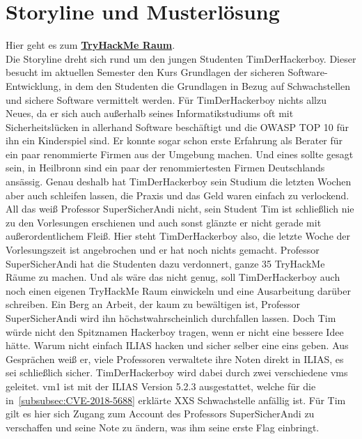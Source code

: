 \documentclass[10pt, a4paper,onecolumn ,titlepage]{article}
\begin{document}
    \section{Storyline und Musterlösung}
    \label{sec:storyline}
    Hier geht es zum \href{https://tryhackme.com/jr/t1mth3h4ck3rb0y}{\textbf{TryHackMe Raum}}.\vspace{0.5cm}
    \\
    Die Storyline dreht sich rund um den jungen Studenten TimDerHackerboy.
    Dieser besucht im aktuellen Semester den Kurs \glqq Grundlagen der sicheren Software-Entwicklung\grqq, in dem den Studenten die Grundlagen in Bezug auf Schwachstellen und sichere Software vermittelt werden.
    Für TimDerHackerboy nichts allzu Neues, da er sich auch außerhalb seines Informatikstudiums oft mit Sicherheitslücken in allerhand Software beschäftigt und die OWASP TOP 10 für ihn ein Kinderspiel sind.
    Er konnte sogar schon erste Erfahrung als Berater für ein paar renommierte Firmen aus der Umgebung machen.
    Und eines sollte gesagt sein, in Heilbronn sind ein paar der renommiertesten Firmen Deutschlands ansässig.
    Genau deshalb hat TimDerHackerboy sein Studium die letzten Wochen aber auch schleifen lassen, die Praxis und das Geld waren einfach zu verlockend.
    All das weiß Professor SuperSicherAndi nicht, sein Student Tim ist schließlich nie zu den Vorlesungen erschienen und auch sonst glänzte er nicht gerade mit außerordentlichem Fleiß.
    Hier steht TimDerHackerboy also, die letzte Woche der Vorlesungszeit ist angebrochen und er hat noch nichts gemacht.
    Professor SuperSicherAndi hat die Studenten dazu verdonnert, ganze 35 TryHackMe Räume zu machen.
    Und als wäre das nicht genug, soll TimDerHackerboy auch noch einen eigenen TryHackMe Raum einwickeln und eine Ausarbeitung darüber schreiben.
    Ein Berg an Arbeit, der kaum zu bewältigen ist, Professor SuperSicherAndi wird ihn höchstwahrscheinlich durchfallen lassen.
    Doch Tim würde nicht den Spitznamen Hackerboy tragen, wenn er nicht eine bessere Idee hätte.
    Warum nicht einfach ILIAS hacken und sicher selber eine eins geben.
    Aus Gesprächen weiß er, viele Professoren verwaltete ihre Noten direkt in ILIAS, es sei schließlich sicher.
    TimDerHackerboy wird dabei durch zwei verschiedene \ac{vm}s geleitet.
    \ac{vm}1 ist mit der ILIAS Version 5.2.3 ausgestattet, welche für die in~\ref{subsubsec:CVE-2018-5688} erklärte XXS Schwachstelle anfällig ist.
    Für Tim gilt es hier sich Zugang zum Account des Professors SuperSicherAndi zu verschaffen und seine Note zu ändern, was ihm seine erste Flag einbringt.
\end{document}
